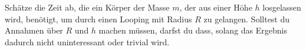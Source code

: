 \begin{Exercise}[label = loopoob, title = Looping, origin = Aaron Wild, diffiulty = 5]
	Schätze die Zeit ab, die ein Körper der Masse $m$, der aus einer Höhe $h$ losgelassen wird, benötigt, um durch einen Looping mit Radius $R$ zu gelangen. Solltest du Annahmen über $R$ und $h$ machen müssen, darfst du dass, solang das Ergebnis dadurch nicht uninteressant oder trivial wird.
\end{Exercise}